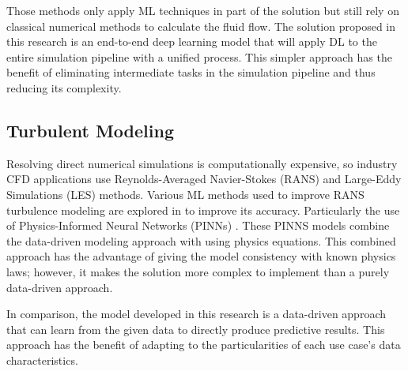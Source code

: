 Those methods only apply ML techniques in part of the solution but still rely on classical numerical methods to calculate the fluid flow. The solution proposed in this research is an end-to-end deep learning model that will apply DL to the entire simulation pipeline with a unified process. This simpler approach has the benefit of eliminating intermediate tasks in the simulation pipeline and thus reducing its complexity.

\subsection*{\textbf{Turbulent Modeling}}
Resolving direct numerical simulations is computationally expensive, so industry CFD applications use Reynolds-Averaged Navier-Stokes (RANS) and Large-Eddy Simulations (LES) methods. Various ML methods used to improve RANS turbulence modeling are explored in \cite{duraisamy_turbulence_2019} to improve its accuracy. Particularly the use of Physics-Informed Neural Networks (PINNs) \cite{wang_physics-guided_2023} \cite{eivazi_physics-informed_2022}. These PINNS models combine the data-driven modeling approach with using physics equations. This combined approach has the advantage of giving the model consistency with known physics laws; however, it makes the solution more complex to implement than a purely data-driven approach. 

In comparison, the model developed in this research is a data-driven approach that can learn from the given data to directly produce predictive results. This approach has the benefit of adapting to the particularities of each use case's data characteristics.


